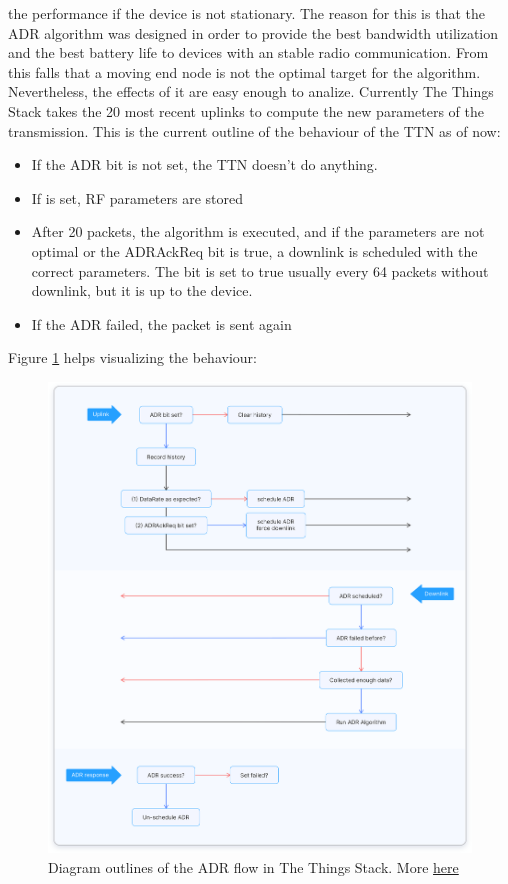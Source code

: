 the performance if the device is not stationary.
The reason for this is that the ADR algorithm was designed in order
to provide the best bandwidth utilization and the best battery life
to devices with an stable radio communication. From this falls that 
a moving end node is not the optimal target for the algorithm. Nevertheless, 
the effects of it are easy enough to analize. 
Currently The Things Stack takes the 20 most recent uplinks 
to compute the new parameters of the transmission.
This is the current outline of the behaviour of the TTN as of now:
\begin{itemize}
    \item If the ADR bit is not set, the TTN doesn't do anything.
    \item If is set, RF parameters are stored
    \item After 20 packets, the algorithm is executed, and if the 
    parameters are not optimal or the ADRAckReq bit is true, a downlink is 
    scheduled with the correct parameters. The bit is set to true usually
    every 64 packets without downlink, but it is up to the device.
    \item If the ADR failed, the packet is sent again
\end{itemize}
Figure \ref{chap1:adr} helps  visualizing the behaviour:\\
\begin{figure}[htbp]
    \centering
    \includegraphics[width = \linewidth]{adr.png}
    \caption{Diagram outlines of the ADR flow in The Things Stack. More \href{https://www.thethingsnetwork.org/docs/lorawan/adaptive-data-rate/}{here}}
    \label{chap1:adr}
\end{figure}
